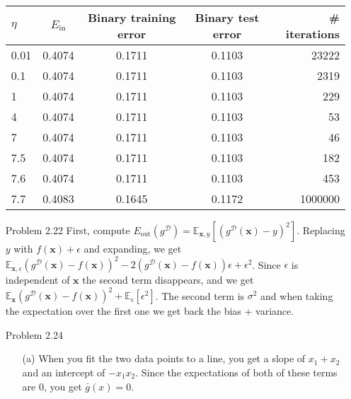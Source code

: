 \documentclass[10pt]{article}
\begin{document}
\begin{enumerate}
  \begin{center}
  \begin{tabular}{l|c|c|c|r}
    $\eta$ & $E_{\text{in}}$ & Binary training error & Binary test error & \# iterations \\
    \hline
    0.01 & 0.4074 & 0.1711 & 0.1103 & 23222 \\
    0.1 & 0.4074 & 0.1711 & 0.1103 & 2319 \\
    1 & 0.4074 & 0.1711 & 0.1103 & 229 \\
    4 & 0.4074 & 0.1711 & 0.1103 & 53 \\
    7 & 0.4074 & 0.1711 & 0.1103 & 46 \\
    7.5 & 0.4074 & 0.1711 & 0.1103 & 182 \\
    7.6 & 0.4074 & 0.1711 & 0.1103 & 453 \\
    7.7 & 0.4083 & 0.1645 & 0.1172 & 1000000 \\
    
  \end{tabular}
  \end{center}

    \item[Problem 2.22] First, compute $E_{\text{out}} (g^{\mathcal{D}}) =
      \mathbb{E}_{\mathbf{x}, y} [ (g^{\mathcal{D}}(\mathbf{x}) - y)^2
      ]$. Replacing $y$ with $f(\mathbf{x}) + \epsilon$ and expanding,
      we get $\mathbb{E}_{\mathbf{x}, \epsilon}
      (g^{\mathcal{D}}(\mathbf{x}) - f(\mathbf{x}))^2 - 2
      (g^{\mathcal{D}}(\mathbf{x}) - f(\mathbf{x})) \epsilon +
      \epsilon^2$. Since $\epsilon$ is independent of $\mathbf{x}$ the
      second term disappears, and we get $\mathbb{E}_{\mathbf{x}}
      (g^{\mathcal{D}}(\mathbf{x}) - f(\mathbf{x}))^2 +
      \mathbb{E}_{\epsilon} [\epsilon^2]$. The second term is
      $\sigma^2$ and when taking the expectation over the first one we
      get back the bias + variance.

    \item[Problem 2.24] 
      \begin{itemize}
        \item[(a)] When you fit the two data points to a line, you get
          a slope of $x_1 + x_2$ and an intercept of $-x_1 x_2$. Since
          the expectations of both of these terms are 0, you get
          $\bar{g} (x) = 0$.


\end{itemize}
\end{enumerate}
\end{document}

